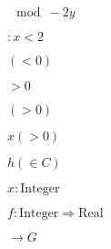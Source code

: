 \documentclass{article}
\begin{document}

$\mod -2y$

$:x<2$

$(<0)$ 

$>0$

$(>0)$

$x(>0)$

$h(\in C)$

$x : \mathrm{Integer}$

$f : \mathrm{Integer} \Rightarrow \mathrm{Real}$

$\rightarrow G$
\end{document}
